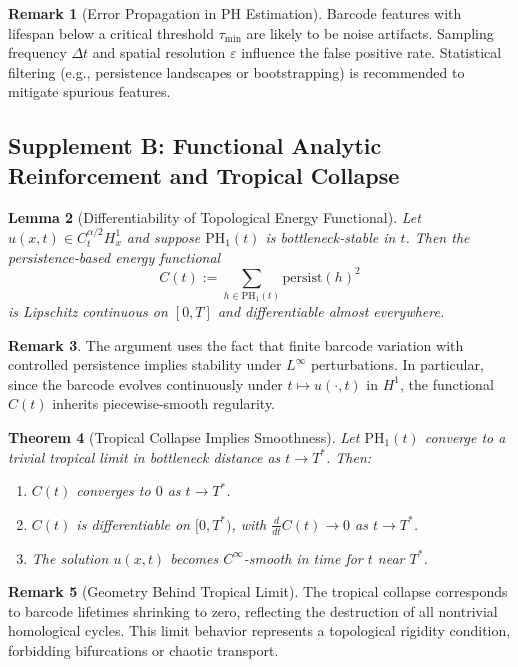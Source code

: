\documentclass[11pt]{article}
\newtheorem{theorem}{Theorem}[section]
\newtheorem{lemma}[theorem]{Lemma}
\theoremstyle{definition}
\newtheorem{remark}[theorem]{Remark}
\begin{document}
\begin{remark}[Error Propagation in PH Estimation]
Barcode features with lifespan below a critical threshold $\tau_{\text{min}}$ are likely to be noise artifacts. Sampling frequency $\Delta t$ and spatial resolution $\varepsilon$ influence the false positive rate. Statistical filtering (e.g., persistence landscapes or bootstrapping) is recommended to mitigate spurious features.
\end{remark}

\subsection{Supplement B: Functional Analytic Reinforcement and Tropical Collapse}

\begin{lemma}[Differentiability of Topological Energy Functional]
\label{lem:Ct_differentiable}
Let $u(x,t) \in C^{\alpha/2}_t H^1_x$ and suppose $\mathrm{PH}_1(t)$ is bottleneck-stable in $t$. Then the persistence-based energy functional
\[
C(t) := \sum_{h \in \mathrm{PH}_1(t)} \mathrm{persist}(h)^2
\]
is Lipschitz continuous on $[0,T]$ and differentiable almost everywhere.
\end{lemma}

\begin{remark}
The argument uses the fact that finite barcode variation with controlled persistence implies stability under $L^\infty$ perturbations. In particular, since the barcode evolves continuously under $t \mapsto u(\cdot,t)$ in $H^1$, the functional $C(t)$ inherits piecewise-smooth regularity.
\end{remark}

\begin{theorem}[Tropical Collapse Implies Smoothness]
Let $\mathrm{PH}_1(t)$ converge to a trivial tropical limit in bottleneck distance as $t \to T^*$. Then:
\begin{enumerate}
  \item $C(t)$ converges to $0$ as $t \to T^*$.
  \item $C(t)$ is differentiable on $[0,T^*)$, with $\frac{d}{dt} C(t) \to 0$ as $t \to T^*$.
  \item The solution $u(x,t)$ becomes $C^\infty$-smooth in time for $t$ near $T^*$.
\end{enumerate}
\end{theorem}

\begin{remark}[Geometry Behind Tropical Limit]
The tropical collapse corresponds to barcode lifetimes shrinking to zero, reflecting the destruction of all nontrivial homological cycles. This limit behavior represents a topological rigidity condition, forbidding bifurcations or chaotic transport.
\end{remark}
\end{document}
